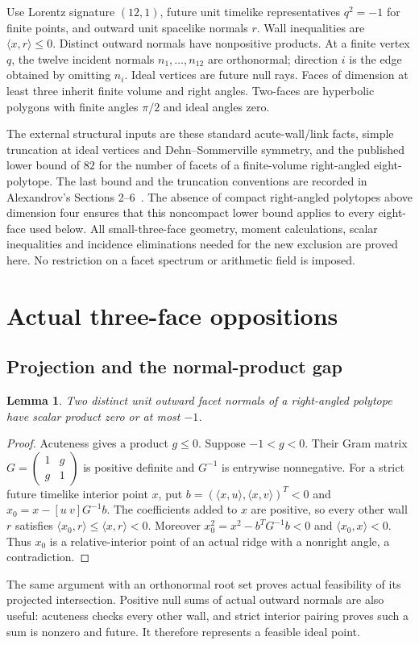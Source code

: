 \documentclass[11pt]{article}
\newtheorem{lemma}[theorem]{Lemma}
\newcommand{\ip}[2]{\langle #1,#2\rangle}
\begin{document}
Use Lorentz signature $(12,1)$, future unit timelike representatives
$q^2=-1$ for finite points, and outward unit spacelike normals $r$.
Wall inequalities are $\ip{x}{r}\le0$. Distinct outward normals
have nonpositive products. At a finite vertex $q$, the twelve incident
normals $n_1,\ldots,n_{12}$ are orthonormal; direction $i$ is the edge
obtained by omitting $n_i$. Ideal vertices are future null rays.
Faces of dimension at least three inherit finite volume and right
angles. Two-faces are hyperbolic polygons with finite angles $\pi/2$
and ideal angles zero.

The external structural inputs are these standard acute-wall/link facts,
simple truncation at ideal vertices and Dehn--Sommerville symmetry, and
the published lower bound of $82$ for the number of facets of a finite-volume
right-angled eight-polytope. The last bound and the truncation conventions
are recorded in Alexandrov's Sections 2--6~\cite{Alex}. The absence of
compact right-angled polytopes above dimension four ensures that this
noncompact lower bound applies to every eight-face used below.
All small-three-face geometry, moment calculations, scalar inequalities
and incidence eliminations needed for the new exclusion are proved here.
No restriction on a facet spectrum or arithmetic field is imposed.

\section{Actual three-face oppositions}
\subsection{Projection and the normal-product gap}
\begin{lemma}\label{lem:gap}
Two distinct unit outward facet normals of a right-angled polytope
have scalar product zero or at most $-1$.
\end{lemma}
\begin{proof}
Acuteness gives a product $g\le0$. Suppose $-1<g<0$. Their
Gram matrix $G=\left(\begin{smallmatrix}1&g\\g&1\end{smallmatrix}\right)$
is positive definite and $G^{-1}$ is entrywise nonnegative. For a
strict future timelike interior point $x$, put
$b=(\ip{x}{u},\ip{x}{v})^T<0$ and
$x_0=x-[u\ v]G^{-1}b$. The coefficients added to $x$ are positive,
so every other wall $r$ satisfies
$\ip{x_0}{r}\le\ip{x}{r}<0$. Moreover
$x_0^2=x^2-b^TG^{-1}b<0$ and $\ip{x_0}{x}<0$.
Thus $x_0$ is a relative-interior point of an actual ridge with a
nonright angle, a contradiction.
\end{proof}
The same argument with an orthonormal root set proves actual
feasibility of its projected intersection. Positive null sums of
actual outward normals are also useful: acuteness checks every other
wall, and strict interior pairing proves such a sum is nonzero and
future. It therefore represents a feasible ideal point.
\end{document}
